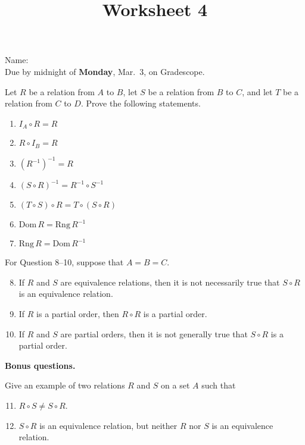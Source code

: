 \documentclass{article}
\title{Worksheet 4}
\author{}\date{}
\begin{document}
\maketitle
\thispagestyle{empty}

\vspace{0.7cm}\noindent
Name: \hspace{0.1cm}\underline{\hspace{7cm}}\\[5pt]
Due by midnight of \textbf{Monday}, Mar.\ 3, on Gradescope.



\vspace{.8cm}\noindent
Let $R$ be a relation from $A$ to $B$, let $S$ be a relation from $B$ to $C$, and let $T$ be a relation from $C$ to $D$. Prove the following statements.
\begin{enumerate}
	\item $I_A\circ R = R$
	\item $R\circ I_B = R$
	\item $(R^{-1})^{-1}=R$
	\item $(S\circ R)^{-1} = R^{-1}\circ S^{-1}$
	\item $(T\circ S)\circ R = T\circ (S\circ R)$
	\item $\mathrm{Dom}\,R = \mathrm{Rng}\,R^{-1}$
	\item $\mathrm{Rng}\,R = \mathrm{Dom}\,R^{-1}$
\end{enumerate}

\vspace{8pt}\noindent
For Question 8--10, suppose that $A=B=C$.

\begin{enumerate}\setcounter{enumi}{7}
	\item If $R$ and $S$ are equivalence relations, then it is not necessarily true that $S\circ R$ is an equivalence relation.
	\item If $R$ is a partial order, then $R\circ R$ is a partial order.
	\item If $R$ and $S$ are partial orders, then it is not generally true that $S\circ R$ is a partial order.
\end{enumerate}

\vspace{8pt}\noindent
\textbf{Bonus questions.}

\vspace{.8pt}\noindent
Give an example of two relations $R$ and $S$ on a set $A$ such that
\begin{enumerate}\setcounter{enumi}{10}
	\item $R\circ S\neq S\circ R$.
	\item $S\circ R$ is an equivalence relation, but neither $R$ nor $S$ is an equivalence relation.
\end{enumerate}
\end{document}
